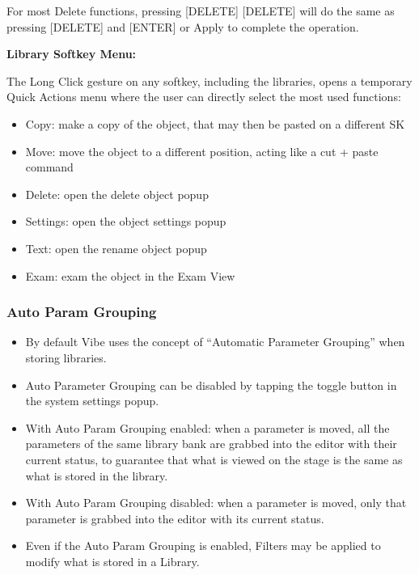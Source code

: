 \documentclass[
]{article}
\begin{document}
For most Delete functions, pressing {[}DELETE{]} {[}DELETE{]} will do the same as pressing {[}DELETE{]} and {[}ENTER{]} or Apply to complete the operation.

\textbf{Library Softkey Menu:}

The Long Click gesture on any softkey, including the libraries, opens a temporary Quick Actions menu where the user can directly select the most used functions:

\begin{itemize}
\item
  Copy: make a copy of the object, that may then be pasted on a different SK
\item
  Move: move the object to a different position, acting like a cut + paste command
\item
  Delete: open the delete object popup
\item
  Settings: open the object settings popup
\item
  Text: open the rename object popup
\item
  Exam: exam the object in the Exam View
\end{itemize}

\hypertarget{auto-param-grouping}{%
\subsubsection{Auto Param Grouping}\label{auto-param-grouping}}

\begin{itemize}
\item
  By default Vibe uses the concept of ``Automatic Parameter Grouping'' when storing libraries.
\item
  Auto Parameter Grouping can be disabled by tapping the toggle button in the system settings popup.
\end{itemize}

\begin{itemize}
\item
  With Auto Param Grouping enabled: when a parameter is moved, all the parameters of the same library bank are grabbed into the editor with their current status, to guarantee that what is viewed on the stage is the same as what is stored in the library.
\item
  With Auto Param Grouping disabled: when a parameter is moved, only that parameter is grabbed into the editor with its current status.
\item
  Even if the Auto Param Grouping is enabled, Filters may be applied to modify what is stored in a Library.
\end{itemize}
\end{document}
